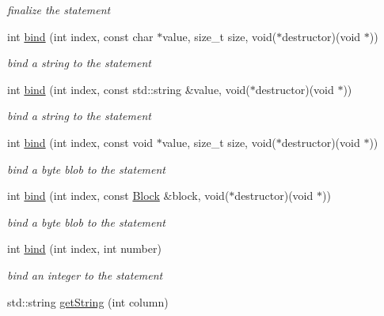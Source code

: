 \begin{DoxyCompactItemize}
\begin{DoxyCompactList}\small\item\em finalize the statement \end{DoxyCompactList}\item 
int \hyperlink{classndn_1_1util_1_1Sqlite3Statement_a6fda9dbd9a26421c8a683cb1866448f4}{bind} (int index, const char $\ast$value, size\+\_\+t size, void($\ast$destructor)(void $\ast$))
\begin{DoxyCompactList}\small\item\em bind a string to the statement \end{DoxyCompactList}\item 
int \hyperlink{classndn_1_1util_1_1Sqlite3Statement_a09d2b7c3fa53b0fdbbd1d5ceb6446616}{bind} (int index, const std\+::string \&value, void($\ast$destructor)(void $\ast$))
\begin{DoxyCompactList}\small\item\em bind a string to the statement \end{DoxyCompactList}\item 
int \hyperlink{classndn_1_1util_1_1Sqlite3Statement_ab1e8dad6aecf53a1625fd52ff3b7ac94}{bind} (int index, const void $\ast$value, size\+\_\+t size, void($\ast$destructor)(void $\ast$))
\begin{DoxyCompactList}\small\item\em bind a byte blob to the statement \end{DoxyCompactList}\item 
int \hyperlink{classndn_1_1util_1_1Sqlite3Statement_a4e04c1d6bcb3014eaa1b2812cb41e718}{bind} (int index, const \hyperlink{classndn_1_1Block}{Block} \&block, void($\ast$destructor)(void $\ast$))
\begin{DoxyCompactList}\small\item\em bind a byte blob to the statement \end{DoxyCompactList}\item 
int \hyperlink{classndn_1_1util_1_1Sqlite3Statement_a6e2f1d8009bc037a55cd1a7ed5a27331}{bind} (int index, int number)
\begin{DoxyCompactList}\small\item\em bind an integer to the statement \end{DoxyCompactList}\item 
std\+::string \hyperlink{classndn_1_1util_1_1Sqlite3Statement_af648ccddfa7b55bc931562bdd4162799}{get\+String} (int column)\hypertarget{classndn_1_1util_1_1Sqlite3Statement_af648ccddfa7b55bc931562bdd4162799}{}\label{classndn_1_1util_1_1Sqlite3Statement_af648ccddfa7b55bc931562bdd4162799}


\end{DoxyCompactItemize}
